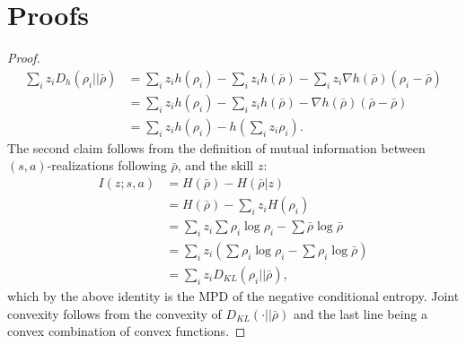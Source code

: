 \documentclass{article}
\theoremstyle{plain}
\theoremstyle{definition}
\theoremstyle{remark}
\begin{document}
\section{Proofs}
\avgBregman*
\begin{proof}
    \begin{align}
        \sum_i z_i D_h(\rho_i || \bar\rho) &= \sum_i z_i h(\rho_i) - \sum_i z_i h(\bar\rho) - \sum_i z_i \nabla h(\bar\rho)(\rho_i - \bar\rho) \\
        &= \sum_i z_i h(\rho_i) - \sum_i z_i h(\bar\rho) - \nabla h(\bar\rho)(\bar\rho - \bar\rho) \\
        &= \sum_i z_i h(\rho_i) - h\left(\sum_i z_i\rho_i\right).
    \end{align}
    The second claim follows from the definition of mutual information between $(s,a)$-realizations following $\bar\rho$, and the skill $z$:
    \begin{align}
        I(z;s,a) 
            &= H(\bar\rho)-H(\bar\rho|z) \\
            &= H(\bar\rho)-\sum_i z_i H(\rho_i) \\
            &= \sum_i z_i\sum\rho_i\log\rho_i - \sum\bar\rho\log\bar\rho\\
            &= \sum_i z_i\left(\sum\rho_i\log\rho_i - \sum\rho_i\log\bar\rho\right)\\
            &= \sum_i z_iD_{KL}(\rho_i || \bar\rho),
    \end{align}
    which by the above identity is the MPD of the negative conditional entropy.
    Joint convexity follows from the convexity of $D_{KL}(\cdot || \bar\rho)$ and the last line being a convex combination of convex functions.
\end{proof}
\end{document}
